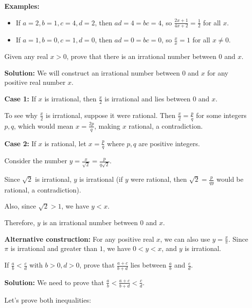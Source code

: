\textbf{Examples:}
\begin{itemize}
\item If $a = 2, b = 1, c = 4, d = 2$, then $ad = 4 = bc = 4$, so $\frac{2x + 1}{4x + 2} = \frac{1}{2}$ for all $x$.
\item If $a = 1, b = 0, c = 1, d = 0$, then $ad = 0 = bc = 0$, so $\frac{x}{x} = 1$ for all $x \neq 0$.
\end{itemize}

\begin{problembox}
Given any real $x > 0$, prove that there is an irrational number between $0$ and $x$.
\end{problembox}

\textbf{Solution:}
We will construct an irrational number between $0$ and $x$ for any positive real number $x$.

\textbf{Case 1:} If $x$ is irrational, then $\frac{x}{2}$ is irrational and lies between $0$ and $x$.

To see why $\frac{x}{2}$ is irrational, suppose it were rational. Then $\frac{x}{2} = \frac{p}{q}$ for some integers $p, q$, which would mean $x = \frac{2p}{q}$, making $x$ rational, a contradiction.

\textbf{Case 2:} If $x$ is rational, let $x = \frac{p}{q}$ where $p, q$ are positive integers.

Consider the number $y = \frac{x}{\sqrt{2}} = \frac{p}{q\sqrt{2}}$.

Since $\sqrt{2}$ is irrational, $y$ is irrational (if $y$ were rational, then $\sqrt{2} = \frac{p}{qy}$ would be rational, a contradiction).

Also, since $\sqrt{2} > 1$, we have $y < x$.

Therefore, $y$ is an irrational number between $0$ and $x$.

\textbf{Alternative construction:}
For any positive real $x$, we can also use $y = \frac{x}{\pi}$. Since $\pi$ is irrational and greater than $1$, we have $0 < y < x$, and $y$ is irrational.

\begin{problembox}
If $\frac{a}{b} < \frac{c}{d}$ with $b > 0, d > 0$, prove that $\frac{a + c}{b + d}$ lies between $\frac{a}{b}$ and $\frac{c}{d}$.
\end{problembox}

\textbf{Solution:}
We need to prove that $\frac{a}{b} < \frac{a + c}{b + d} < \frac{c}{d}$.

Let's prove both inequalities:

